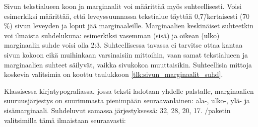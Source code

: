
Sivun tekstialueen koon ja marginaalit voi määrittää myös
suhteellisesti. Voisi esimerkiksi määrittää, että leveyssuunnassa
tekstialue täyttää 0,7\=/kertaisesti (70\,\%) sivun leveyden ja loput
jää marginaaleille. Marginaalien keskinäiset suhteetkin voi ilmaista
suhdelukuna: esimerkiksi vasemman (sisä) ja oikean (ulko) marginaalin
suhde voisi olla 2:3. Suhteellisessa tavassa ei tarvitse ottaa kantaa
sivun kokoon eikä muihinkaan varsinaisiin mittoihin, vaan samat
tekstialueen ja marginaalien suhteet säilyvät, vaikka sivukokoa
muuttaisikin. Suhteellisia mittoja koskevia valitsimia on koottu
taulukkoon \ref{tlk:sivun_marginaalit_suhd}.


Klassisessa kirjatypografiassa, jossa teksti ladotaan yhdelle palstalle,
marginaalien suuruusjärjestys on suurimmasta pienimpään seuraavanlainen:
ala-, ulko-, ylä- ja sisämarginaali. Suhdeluvut samassa järjestyksessä:
32, 28, 20, 17. \-/paketin valitsimilla tämä
ilmaistaan seuraavasti:

